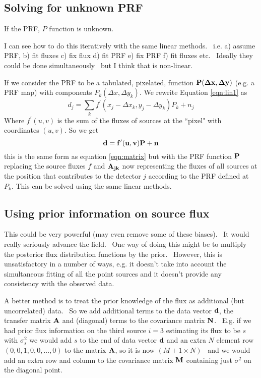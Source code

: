 \documentclass{article}
\begin{document}
\subsection{Solving for unknown PRF}
If the PRF, $P$ function is unknown.

I can see how to do this iteratively with the same linear methods.  i.e. a) assume PRF, b) fit fluxes c) fix flux d) fit PRF e) fix PRF f) fit fluxes etc.  Ideally they could be done simultaneously  but I think that is non-linear.

If we consider the PRF to be a tabulated, pixelated, function ${\bf P}({\bf \Delta x}, {\bf \Delta y})$ (e.g. a PRF map) with components $P_k( \Delta x, \Delta y_k)$. We rewrite Equation \ref{eqn:lin1} as
\begin{equation}
d_j=\sum_k{f^\prime(x_j-\Delta x_k, y_j-\Delta y_k)}P_k+n_j \label{eqn:lin2}
\end{equation}
Where $f^\prime(u,v)$ is the sum of the fluxes of sources at the ``pixel" with coordinates $(u,v)$. So we get 
\begin{equation}
{\bf d}={\bf f}^\prime({\bf u},{\bf v}){\bf P}+{\bf n}\label{eqn:linprf2}
\end{equation}
this is the same form as equation \ref{eqn:matrix} but with the PRF function ${\bf P}$ replacing the source fluxes $f$ and ${\bf A_{jk}}$ now representing the fluxes of all sources at the position that contributes to the detector $j$ according to the PRF defined at $P_k$. This can be solved using the same linear methods.
\subsection{Using prior information on source flux}
This could be very powerful (may even remove some of these biases).  It would really seriously advance the field.  One way of doing this might be to multiply the posterior flux distribution functions by the prior.  However, this is unsatisfactory in a number of ways, e.g. it doesn't take into account the simultaneous fitting of all the point sources and it doesn't provide any consistency with the observed data. 

A better method is to treat the prior knowledge of the flux as additional (but uncorrelated) data.  So we add additional terms to the data vector ${\bf d}$, the transfer matrix ${\bf A}$ and (diagonal) terms to the covariance matrix ${\bf N}$.  E.g. if we had prior flux information on the third source $i=3$ estimating its flux to be $s$ with $\sigma^2_s$ we would add $s$ to the end of data vector ${\bf d}$ and an extra $N$ element row $(0,0,1,0,0,...,0)$ to the matrix ${\bf A}$, so it is now $(M+1 \times N)$  and we would add an extra row and column to the covariance matrix ${\bf M}$ containing just $\sigma^2$ on the diagonal point.
\end{document}
